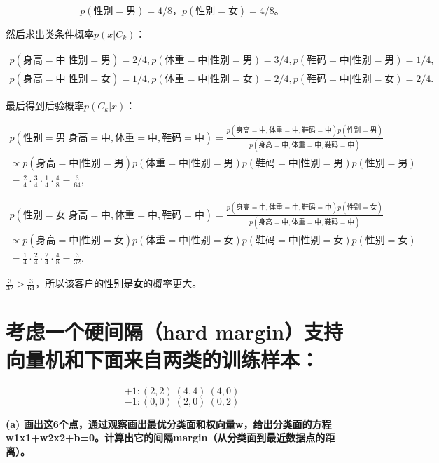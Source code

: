 \documentclass{article}
\begin{document}
\begin{equation}
    p(性别=男)=4/8，p(性别=女)=4/8。
\end{equation}

然后求出类条件概率$p(x|C_k)$：

\begin{equation}
\begin{split}
    p(身高=中|性别=男)=2/4, p(体重=中|性别=男)=3/4, p(鞋码=中|性别=男)=1/4, \\
    p(身高=中|性别=女)=1/4, p(体重=中|性别=女)=2/4, p(鞋码=中|性别=女)=2/4.
\end{split}
\end{equation}

最后得到后验概率$p(C_k|x)$：

\begin{equation}
\begin{split}
    p(性别=男|身高=中,体重=中,鞋码=中)=\frac{p(身高=中,体重=中,鞋码=中)p(性别=男)}{p(身高=中,体重=中,鞋码=中)} \\
    \propto p(身高=中|性别=男)p(体重=中|性别=男)p(鞋码=中|性别=男)p(性别=男) \\
    =\frac24\cdot\frac34\cdot\frac14\cdot\frac48=\frac{3}{64},
\end{split}
\end{equation}

\begin{equation}
\begin{split}
    p(性别=女|身高=中,体重=中,鞋码=中)=\frac{p(身高=中,体重=中,鞋码=中)p(性别=女)}{p(身高=中,体重=中,鞋码=中)} \\
    \propto p(身高=中|性别=女)p(体重=中|性别=女)p(鞋码=中|性别=女)p(性别=女) \\
    =\frac14\cdot\frac24\cdot\frac24\cdot\frac48=\frac{3}{32}.
\end{split}
\end{equation}

$\frac{3}{32}>\frac{3}{64}$，所以该客户的性别是\textbf{女}的概率更大。

\section{考虑一个硬间隔（hard margin）支持向量机和下面来自两类的训练样本：}
$$
+1: (2,2)\ (4,4)\ (4,0)
$$
$$
-1: (0,0)\ (2,0)\ (0,2)
$$

\textbf{(a) 画出这6个点，通过观察画出最优分类面和权向量w，给出分类面的方程w1x1+w2x2+b=0。计算出它的间隔margin（从分类面到最近数据点的距离）。}
\end{document}
